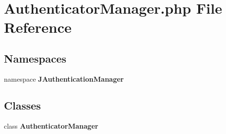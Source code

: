 \section{AuthenticatorManager.php File Reference}
\label{AuthenticatorManager_8php}
\subsection*{Namespaces}
\begin{CompactItemize}
\item 
namespace {\bf JAuthenticationManager}
\end{CompactItemize}
\subsection*{Classes}
\begin{CompactItemize}
\item 
class {\bf AuthenticatorManager}
\end{CompactItemize}
